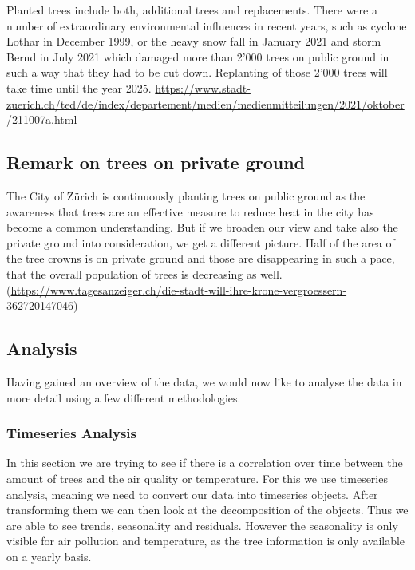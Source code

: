 \documentclass[
]{article}
\begin{document}
Planted trees include both, additional trees and replacements. There
were a number of extraordinary environmental influences in recent years,
such as cyclone Lothar in December 1999, or the heavy snow fall in
January 2021 and storm Bernd in July 2021 which damaged more than 2'000
trees on public ground in such a way that they had to be cut down.
Replanting of those 2'000 trees will take time until the year 2025.
\url{https://www.stadt-zuerich.ch/ted/de/index/departement/medien/medienmitteilungen/2021/oktober/211007a.html}

\hfill\break

\hypertarget{remark-on-trees-on-private-ground}{%
\subsection{Remark on trees on private
ground}\label{remark-on-trees-on-private-ground}}

\hfill\break
The City of Zürich is continuously planting trees on public ground as
the awareness that trees are an effective measure to reduce heat in the
city has become a common understanding. But if we broaden our view and
take also the private ground into consideration, we get a different
picture. Half of the area of the tree crowns is on private ground and
those are disappearing in such a pace, that the overall population of
trees is decreasing as well.\\
(\url{https://www.tagesanzeiger.ch/die-stadt-will-ihre-krone-vergroessern-362720147046})

\hfill\break

\hypertarget{analysis}{%
\subsection{Analysis}\label{analysis}}

Having gained an overview of the data, we would now like to analyse the
data in more detail using a few different methodologies.

\hypertarget{timeseries-analysis}{%
\subsubsection{Timeseries Analysis}\label{timeseries-analysis}}

In this section we are trying to see if there is a correlation over time
between the amount of trees and the air quality or temperature. For this
we use timeseries analysis, meaning we need to convert our data into
timeseries objects. After transforming them we can then look at the
decomposition of the objects. Thus we are able to see trends,
seasonality and residuals. However the seasonality is only visible for
air pollution and temperature, as the tree information is only available
on a yearly basis.
\end{document}

